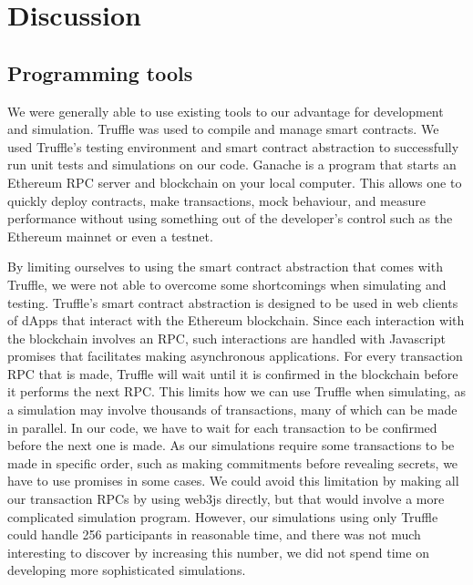 \chapter{Discussion}
\label{chap:discussion}


\section{Programming tools}
\label{sec:tools}

We were generally able to use existing tools to our advantage for development and simulation. Truffle was used to compile and manage smart contracts. We used Truffle's testing environment and smart contract abstraction to successfully run unit tests and simulations on our code. Ganache is a program that starts an Ethereum RPC server and blockchain on your local computer. This allows one to quickly deploy contracts, make transactions, mock behaviour, and measure performance without using something out of the developer's control such as the Ethereum mainnet or even a testnet.

By limiting ourselves to using the smart contract abstraction that comes with Truffle, we were not able to overcome some shortcomings when simulating and testing. Truffle's smart contract abstraction is designed to be used in web clients of dApps that interact with the Ethereum blockchain. Since each interaction with the blockchain involves an RPC, such interactions are handled with Javascript promises that facilitates making asynchronous applications. For every transaction RPC that is made, Truffle will wait until it is confirmed in the blockchain before it performs the next RPC. This limits how we can use Truffle when simulating, as a simulation may involve thousands of transactions, many of which can be made in parallel. In our code, we have to wait for each transaction to be confirmed before the next one is made. As our simulations require some transactions to be made in specific order, such as making commitments before revealing secrets, we have to use promises in some cases. We could avoid this limitation by making all our transaction RPCs by using web3js directly, but that would involve a more complicated simulation program. However, our simulations using only Truffle could handle 256 participants in reasonable time, and there was not much interesting to discover by increasing this number, we did not spend time on developing more sophisticated simulations. 

